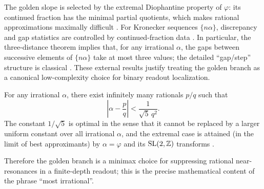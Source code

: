 The golden slope is selected by the extremal Diophantine property of $\varphi$: its continued fraction has the minimal partial quotients, which makes rational approximations maximally difficult \cite{Khinchin1964}. For Kronecker sequences $\{n\alpha\}$, discrepancy and gap statistics are controlled by continued-fraction data \cite{KuipersNiederreiter1974}. In particular, the three-distance theorem implies that, for any irrational $\alpha$, the gaps between successive elements of $\{n\alpha\}$ take at most three values; the detailed ``gap/step'' structure is classical \cite{Slater1967}. These external results justify treating the golden branch as a canonical low-complexity choice for binary readout localization.
\begin{theorem}\label{thm:hurwitz_golden}
For any irrational $\alpha$, there exist infinitely many rationals $p/q$ such that
\begin{equation}
\left|\alpha-\frac{p}{q}\right|<\frac{1}{\sqrt{5}\,q^2}.
\end{equation}
The constant $1/\sqrt{5}$ is optimal in the sense that it cannot be replaced by a larger uniform constant over all irrational $\alpha$, and the extremal case is attained (in the limit of best approximants) by $\alpha=\varphi$ and its $\mathrm{SL}(2,\mathbb{Z})$ transforms \cite{Khinchin1964,KuipersNiederreiter1974}.
\end{theorem}

Therefore the golden branch is a minimax choice for suppressing rational near-resonances in a finite-depth readout; this is the precise mathematical content of the phrase ``most irrational''.
